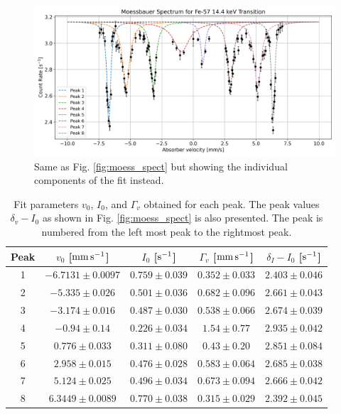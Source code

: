 \documentclass[a4paper]{report}
\numberwithin{equation}{section}
\begin{document}
\begin{figure}[htb!]
	\centering
	\includegraphics[width=0.8\columnwidth]{moess_spect_comps.png}
	\caption{Same as Fig. \ref{fig:moess_spect} but showing the individual components of the fit instead.}
	\label{fig:moess_spect_comps}
\end{figure}

\begin{table}[!ht]
    \centering
    \begin{tabular}{|c|c|c|c|c|}
    \hline
    Peak & $v_0$ [$\si[]{\milli\meter\per\second}$] & $I_0$ [$\si[]{\per\second}$] & $\Gamma_v$ [$\si[]{\milli\meter\per\second}$] & $\delta_I - I_0$ [$\si[]{\per\second}$]\\ \hline
        1 &$-6.7131 \pm 0.0097 $& $0.759 \pm 0.039$ & $0.352 \pm 0.033$ & $2.403 \pm 0.046$ \\ \hline
        2 &$-5.335 \pm 0.026 $& $0.501 \pm 0.036$ & $0.682 \pm 0.096$ & $2.661 \pm 0.043$ \\ \hline
        3 &$-3.174 \pm 0.016 $& $0.487 \pm 0.030$ & $0.538 \pm 0.066$ & $2.674 \pm 0.039$ \\ \hline
        4 &$-0.94 \pm 0.14 $& $0.226 \pm 0.034$ & $1.54 \pm 0.77$ & $2.935 \pm 0.042$ \\ \hline
        5 &$ 0.776 \pm 0.033 $& $0.311 \pm 0.080$ & $0.43 \pm 0.20$ & $2.851 \pm 0.084$ \\ \hline
        6 &$ 2.958 \pm 0.015 $& $0.476 \pm 0.028$ & $0.583 \pm 0.064$ & $2.685 \pm 0.038$ \\ \hline
        7 &$ 5.124 \pm 0.025 $& $0.496 \pm 0.034$ & $0.673 \pm 0.094$ & $2.666 \pm 0.042$ \\ \hline
        8 &$ 6.3449 \pm 0.0089 $& $0.770 \pm 0.038$ & $0.315 \pm 0.029$ & $2.392 \pm 0.045$ \\ \hline
    \end{tabular}
    \caption{Fit parameters $v_0$, $I_0$, and $\Gamma_v$ obtained for each peak. The peak values $\delta_v - I_0$ 
			as shown in Fig. \ref{fig:moess_spect} is also presented.
			 The peak is numbered from the left most peak to the rightmost peak.}
	\label{tab:fit_params}
\end{table}
\end{document}
